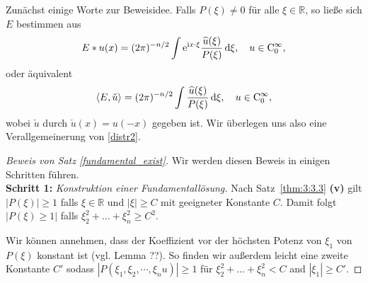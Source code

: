 Zunächst einige Worte zur Beweisidee.  Falls $P(\xi)\neq 0$ für alle $\xi\in \mathbb R$, so ließe sich $E$ bestimmen aus
\begin{equation}\label{distr1}
E*u(x) = (2\pi)^{-n/2}\int \mathrm e^{\mathrm i x\cdot \xi} \frac{\widehat u(\xi)}{P(\xi)}\, \mathrm d\xi, \quad u \in \mathrm C_0^\infty,
\end{equation}
oder äquivalent
\begin{equation}\label{distr2}
\langle E,\check u\rangle = (2\pi)^{-n/2} \int \frac{\widehat u(\xi)}{P(\xi)}\, \mathrm d\xi, \quad u \in\mathrm C_0^\infty,
\end{equation}
wobei $\check u$ durch $\check u(x)=u(-x)$ gegeben ist. Wir überlegen uns also eine Verallgemeinerung von \eqref{distr2}. 

\begin{proof}[Beweis von Satz \ref{fundamental_exist}]
Wir werden diesen Beweis in einigen Schritten führen.
\vspace{1mm}\\
\textbf{Schritt 1:} \emph{Konstruktion einer Fundamentallösung.}
Nach Satz~\ref{thm:3:3.3} {\bf (v)} gilt $|P(\xi)|\ge 1$ falls $\xi\in \mathbb R$ und $|\xi|\ge C$ mit geeigneter Konstante $C$.  Damit folgt $|P(\xi)\ge 1|$ falls $\xi_2^2+ \ldots + \xi_n^2 \ge C^2$.  

Wir können annehmen, dass der Koeffizient vor der höchsten Potenz von $\xi_1$ von $P(\xi)$ konstant ist (vgl. Lemma ??). 
So finden wir außerdem leicht eine zweite Konstante $C'$ sodass $|P(\xi_1, \xi_2, \cdots, \xi_nu)|\ge 1$ für $\xi_2^2+\ldots + \xi_n^2< C$ and $|\xi_1|\ge C'$.  


\end{proof}
